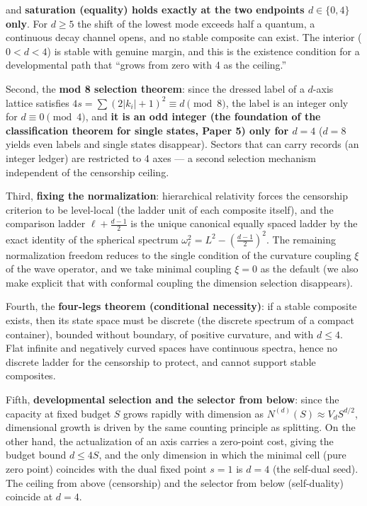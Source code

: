 \documentclass[
]{article}
\begin{document}
and \textbf{saturation (equality) holds exactly at the two endpoints
\(d\in\{0,4\}\) only}. For \(d\ge5\) the shift of the lowest mode
exceeds half a quantum, a continuous decay channel opens, and no stable
composite can exist. The interior (\(0<d<4\)) is stable with genuine
margin, and this is the existence condition for a developmental path
that ``grows from zero with 4 as the ceiling.''

Second, the \textbf{mod 8 selection theorem}: since the dressed label of
a \(d\)-axis lattice satisfies \(4s=\sum(2|k_i|+1)^2\equiv d\pmod 8\),
the label is an integer only for \(d\equiv0\pmod4\), and \textbf{it is
an odd integer (the foundation of the classification theorem for single
states, Paper 5) only for \(d=4\)} (\(d=8\) yields even labels and
single states disappear). Sectors that can carry records (an integer
ledger) are restricted to 4 axes --- a second selection mechanism
independent of the censorship ceiling.

Third, \textbf{fixing the normalization}: hierarchical relativity forces
the censorship criterion to be level-local (the ladder unit of each
composite itself), and the comparison ladder \(\ell+\tfrac{d-1}2\) is
the unique canonical equally spaced ladder by the exact identity of the
spherical spectrum \(\omega_\ell^2=L^2-(\tfrac{d-1}2)^2\). The remaining
normalization freedom reduces to the single condition of the curvature
coupling \(\xi\) of the wave operator, and we take minimal coupling
\(\xi=0\) as the default (we also make explicit that with conformal
coupling the dimension selection disappears).

Fourth, the \textbf{four-legs theorem (conditional necessity)}: if a
stable composite exists, then its state space must be discrete (the
discrete spectrum of a compact container), bounded without boundary, of
positive curvature, and with \(d\le4\). Flat infinite and negatively
curved spaces have continuous spectra, hence no discrete ladder for the
censorship to protect, and cannot support stable composites.

Fifth, \textbf{developmental selection and the selector from below}:
since the capacity at fixed budget \(S\) grows rapidly with dimension as
\(N^{(d)}(S)\approx V_d S^{d/2}\), dimensional growth is driven by the
same counting principle as splitting. On the other hand, the
actualization of an axis carries a zero-point cost, giving the budget
bound \(d\le4S\), and the only dimension in which the minimal cell (pure
zero point) coincides with the dual fixed point \(s=1\) is \(d=4\) (the
self-dual seed). The ceiling from above (censorship) and the selector
from below (self-duality) coincide at \(d=4\).
\end{document}
